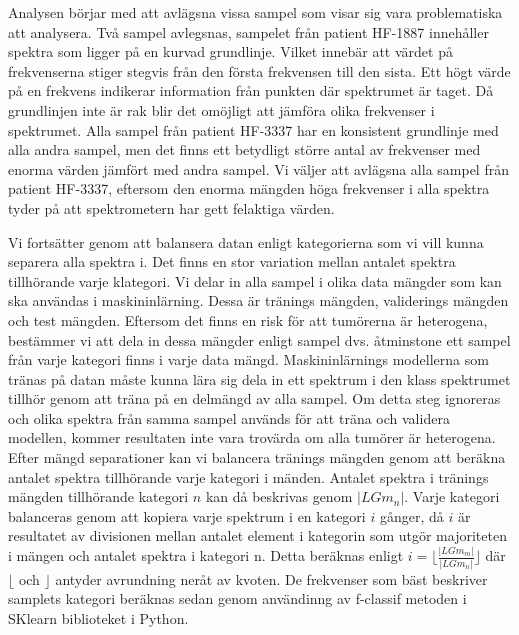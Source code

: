 Analysen börjar med att avlägsna vissa sampel som visar sig vara problematiska att analysera. Två sampel avlegsnas, sampelet från patient HF-1887 innehåller spektra som ligger på en kurvad grundlinje. Vilket innebär att värdet på frekvenserna stiger stegvis från den första frekvensen till den sista. Ett högt värde på en frekvens indikerar information från punkten där spektrumet är taget. Då grundlinjen inte är rak blir det omöjligt att jämföra olika frekvenser i spektrumet. Alla sampel från patient HF-3337 har en konsistent grundlinje med alla andra sampel, men det finns ett betydligt större antal av frekvenser med enorma värden jämfört med andra sampel. Vi väljer att avlägsna alla sampel från patient HF-3337, eftersom den enorma mängden höga frekvenser i alla spektra tyder på att spektrometern har gett felaktiga värden.

Vi fortsätter genom att balansera datan enligt kategorierna som vi vill kunna separera alla spektra i. Det finns en stor variation mellan antalet spektra tillhörande varje klategori. Vi delar in alla sampel i olika data mängder som kan ska användas i maskininlärning. Dessa är tränings mängden, validerings mängden och test mängden. Eftersom det finns en risk för att tumörerna är heterogena, bestämmer vi att dela in dessa mängder enligt sampel dvs. åtminstone ett sampel från varje kategori finns i varje data mängd. Maskininlärnings modellerna som tränas på datan måste kunna lära sig dela in ett spektrum i den klass spektrumet tillhör genom att träna på en delmängd av alla sampel. Om detta steg ignoreras och olika spektra från samma sampel används för att träna och validera modellen, kommer resultaten inte vara trovärda om alla tumörer är heterogena. Efter mängd separationer kan vi balancera tränings mängden genom att beräkna antalet spektra tillhörande varje kategori i mänden. Antalet spektra i tränings mängden tillhörande kategori $n$ kan då beskrivas genom $|LGm_n|$. Varje kategori balanceras genom att kopiera varje spektrum i en kategori $i$ gånger, då $i$ är resultatet av divisionen mellan antalet element i kategorin som utgör majoriteten i mängen och antalet spektra i kategori n. Detta beräknas enligt $i = \lfloor \frac{|LGm_m|}{|LGm_n|} \rfloor$ där $\lfloor$ och $\rfloor$ antyder avrundning neråt av kvoten. De frekvenser som bäst beskriver samplets kategori beräknas sedan genom användinng av f-classif metoden i SKlearn biblioteket i Python.

